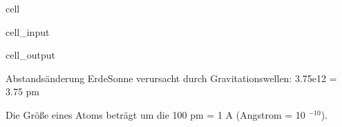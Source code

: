 \documentclass[letterpaper,10pt,english]{jupyterBook}
\begin{document}
\begin{sphinxuseclass}{cell}\begin{sphinxVerbatimInput}

\begin{sphinxuseclass}{cell_input}
\begin{sphinxVerbatim}[commandchars=\\\{\}]
   
    
   
\end{sphinxVerbatim}

\end{sphinxuseclass}\end{sphinxVerbatimInput}
\begin{sphinxVerbatimOutput}

\begin{sphinxuseclass}{cell_output}
\begin{sphinxVerbatim}[commandchars=\\\{\}]
Abstandsänderung Erde\PYGZhy{}Sonne verursacht durch Gravitationswellen:  3.75e\PYGZhy{}12  =  3.75 pm
\end{sphinxVerbatim}

\end{sphinxuseclass}\end{sphinxVerbatimOutput}

\end{sphinxuseclass}
\sphinxAtStartPar
Die Größe eines Atoms beträgt um die 100 pm = 1 A (Angstrom = 10 \(^{-10}\)).
\end{document}
